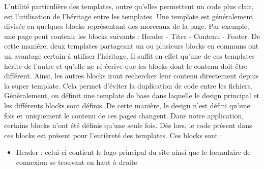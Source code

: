 \documentclass[12pt, a4paper, oneside]{article}
\begin{document}
    \indent L'utilité particulière des templates, outre qu'elles permettent un code plus clair, est l'utilisation de l'héritage entre les templates. Une template est généralement divisée en quelques blocks représentant des morceaux de la page. Par exemple, une page peut contenir les blocks suivants : Header - Titre - Contenu - Footer. De cette manière, deux templates partageant un ou plusieurs blocks en communs ont un avantage certain à utiliser l'héritage. Il suffit en effet qu'une de ces templates hérite de l'autre et qu'elle ne ré-écrive que les blocks dont le contenu doit être différent. Ainsi, les autres blocks iront rechercher leur contenu directement depuis la super template. Cela permet d'éviter la duplication de code entre les fichiers. Généralement, on définit une template de base dans laquelle le design principal et les différents blocks sont définis. De cette manière, le design n'est défini qu'une fois et uniquement le contenu de ces pages changent. Dans notre application, certains blocks n'ont été définis qu'une seule fois. Dès lors, le code présent dans ces blocks est présent pour l'entièreté des templates. Ces blocks sont :
    \begin{itemize}
        \item Header : celui-ci contient le logo principal du site ainsi que le formulaire de connexion se trouvant en haut à droite
    \end{itemize}
\end{document}
